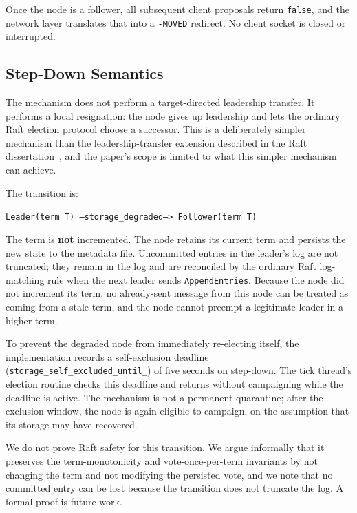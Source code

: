 \documentclass[conference, a4paper]{IEEEtran}
\begin{document}
Once the node is a follower, all subsequent client proposals return
\texttt{false}, and the network layer translates that into a
\texttt{-MOVED} redirect. No client socket is closed or interrupted.

\subsection{Step-Down Semantics}

The mechanism does not perform a target-directed leadership transfer.
It performs a local resignation: the node gives up leadership and lets
the ordinary Raft election protocol choose a successor. This is a
deliberately simpler mechanism than the leadership-transfer extension
described in the Raft dissertation~\cite{raft_dissertation}, and the
paper's scope is limited to what this simpler mechanism can achieve.

The transition is:

\begin{center}
\texttt{Leader(term T) --storage\_degraded--> Follower(term T)}
\end{center}

The term is \textbf{not} incremented. The node retains its current term
and persists the new state to the metadata file. Uncommitted entries in
the leader's log are not truncated; they remain in the log and are
reconciled by the ordinary Raft log-matching rule when the next leader
sends \texttt{AppendEntries}. Because the node did not increment its
term, no already-sent message from this node can be treated as coming
from a stale term, and the node cannot preempt a legitimate leader in a
higher term.

To prevent the degraded node from immediately re-electing itself, the
implementation records a self-exclusion deadline
(\texttt{storage\_self\_excluded\_until\_}) of five seconds on step-down.
The tick thread's election routine checks this deadline and returns
without campaigning while the deadline is active. The mechanism is not
a permanent quarantine; after the exclusion window, the node is again
eligible to campaign, on the assumption that its storage may have
recovered.

We do not prove Raft safety for this transition. We argue informally
that it preserves the term-monotonicity and vote-once-per-term
invariants by not changing the term and not modifying the persisted
vote, and we note that no committed entry can be lost because the
transition does not truncate the log. A formal proof is future work.
\end{document}
